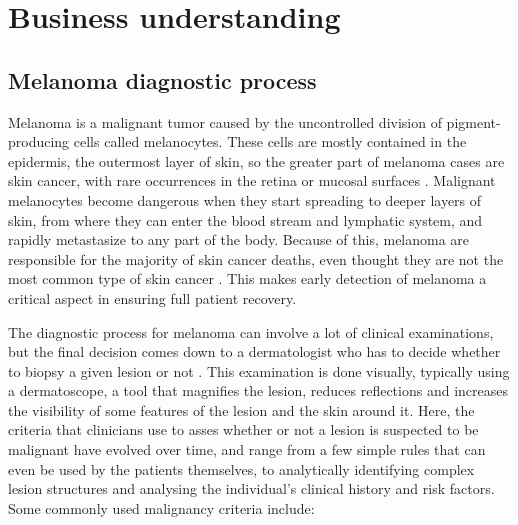 \chapter{Business understanding}
\label{ch:business_understanding}

\section{Melanoma diagnostic process}
Melanoma is a malignant tumor caused by the uncontrolled division of pigment-producing cells called melanocytes. These cells are mostly contained in the epidermis, the outermost layer of skin, so the greater part of melanoma cases are skin cancer, with rare occurrences in the retina or mucosal surfaces \cite{visual_inspection}. Malignant melanocytes become dangerous when they start spreading to deeper layers of skin, from where they can enter the blood stream and lymphatic system, and rapidly metastasize to any part of the body. Because of this, melanoma are responsible for the majority of skin cancer deaths, even thought they are not the most common type of skin cancer \cite{cnn_vs_derm}. 
This makes early detection of melanoma a critical aspect in ensuring full patient recovery.

The diagnostic process for melanoma can involve a lot of clinical examinations, but the final decision comes down to a dermatologist who has to decide whether to biopsy a given lesion or not \cite{visual_inspection}. This examination is done visually, typically using a dermatoscope, a tool that magnifies the lesion, reduces reflections and increases the visibility of some features of the lesion and the skin around it. Here, the criteria that clinicians use to asses whether or not a lesion is suspected to be malignant have evolved over time, and range from a few simple rules that can even be used by the patients themselves, to analytically identifying complex lesion structures and analysing the individual's clinical history and risk factors. Some commonly used malignancy criteria include:

